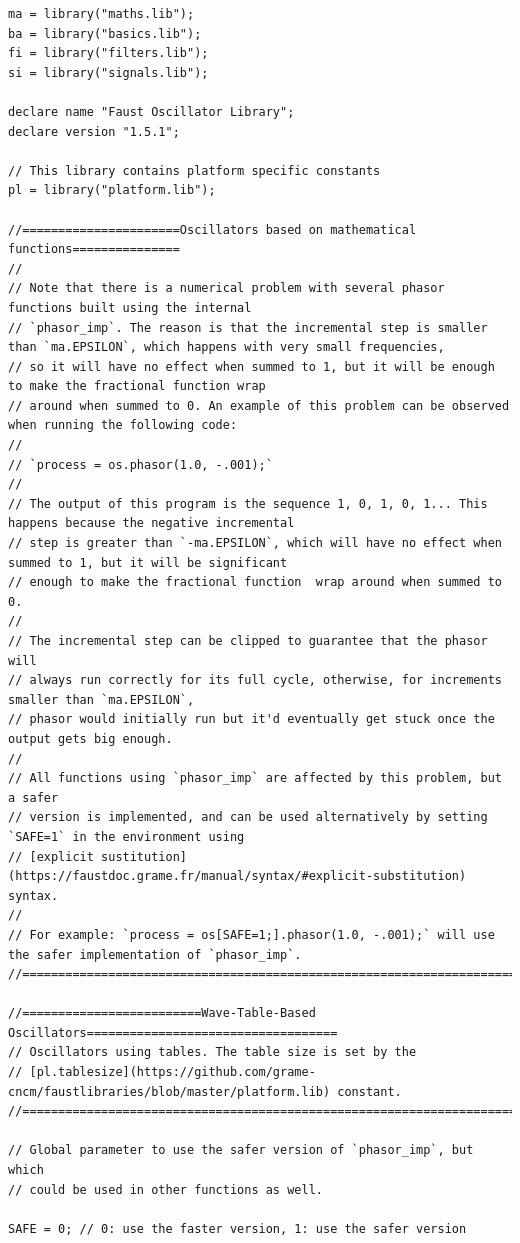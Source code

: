 \documentclass{article}
\begin{document}
\begin{lstlisting}[caption=\texttt{oscillators.lib}]
ma = library("maths.lib");
ba = library("basics.lib");
fi = library("filters.lib");
si = library("signals.lib");

declare name "Faust Oscillator Library";
declare version "1.5.1";

// This library contains platform specific constants
pl = library("platform.lib");

//======================Oscillators based on mathematical functions===============
//
// Note that there is a numerical problem with several phasor functions built using the internal
// `phasor_imp`. The reason is that the incremental step is smaller than `ma.EPSILON`, which happens with very small frequencies, 
// so it will have no effect when summed to 1, but it will be enough to make the fractional function wrap 
// around when summed to 0. An example of this problem can be observed when running the following code:
//
// `process = os.phasor(1.0, -.001);`
//
// The output of this program is the sequence 1, 0, 1, 0, 1... This happens because the negative incremental 
// step is greater than `-ma.EPSILON`, which will have no effect when summed to 1, but it will be significant 
// enough to make the fractional function  wrap around when summed to 0.
//
// The incremental step can be clipped to guarantee that the phasor will 
// always run correctly for its full cycle, otherwise, for increments smaller than `ma.EPSILON`, 
// phasor would initially run but it'd eventually get stuck once the output gets big enough.
// 
// All functions using `phasor_imp` are affected by this problem, but a safer
// version is implemented, and can be used alternatively by setting `SAFE=1` in the environment using 
// [explicit sustitution](https://faustdoc.grame.fr/manual/syntax/#explicit-substitution) syntax.
// 
// For example: `process = os[SAFE=1;].phasor(1.0, -.001);` will use the safer implementation of `phasor_imp`.
//=================================================================================

//=========================Wave-Table-Based Oscillators===================================
// Oscillators using tables. The table size is set by the 
// [pl.tablesize](https://github.com/grame-cncm/faustlibraries/blob/master/platform.lib) constant.
//========================================================================================

// Global parameter to use the safer version of `phasor_imp`, but which
// could be used in other functions as well.

SAFE = 0; // 0: use the faster version, 1: use the safer version


\end{lstlisting}
\end{document}
